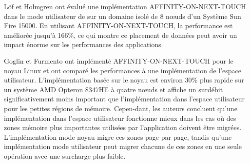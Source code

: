 Löf et Holmgren \cite{HEN000} ont évalué une implémentation AFFINITY-ON-NEXT-TOUCH dans le mode utilisateur de sur un domaine isolé de 8 nœuds d'un Système Sun Fire 15000.
En utilisant AFFINITY-ON-NEXT-TOUCH, la performance est améliorée jusqu'à 166\%, ce qui montre ce placement de données peut avoir un impact énorme sur les performances des applications.

Goglin et Furmento \cite{GogFur09} ont implémenté AFFINITY-ON-NEXT-TOUCH pour le noyau Linux et ont comparé les performances à une implémentation de l'espace utilisateur. 
L'implémentation basée sur le noyau est environ 30\% plus rapide sur un système AMD Opteron 8347HE à quatre nœuds et affiche un surdébit significativement moins important que l'implémentation dans l'espace utilisateur pour les petites régions de mémoire. 
Cepen-dant, les auteurs concluent qu'une implémentation dans l'espace utilisateur fonctionne mieux dans les cas où des zones mémoire plus importantes utilisées par l'application doivent être migrées. 
L'implémentation mode noyau migre ces zones page par page, tandis qu'une implémentation mode utilisateur peut migrer chacune de ces zones en une seule opération avec une surcharge plus faible.
%
